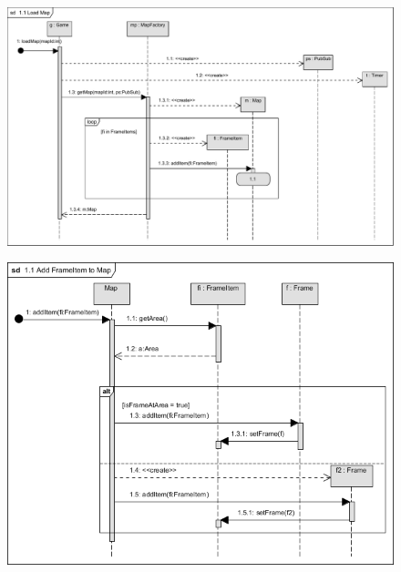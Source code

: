 		\begin{figure}[h!]
			\begin{center}
				\includegraphics[scale=0.8]{resources/seq_1-0_newMap}
				\caption{}
			\end{center}
		\end{figure}
		
		\begin{figure}[h!]
			\begin{center}
				\includegraphics[scale=0.8]{resources/seq_1-1_addFrameItemToMap.png}
				\caption{}
			\end{center}
		\end{figure}
		
